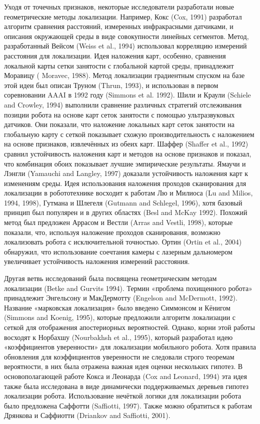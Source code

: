 \documentclass[10pt,a4paper]{article}
\begin{document}
Уходя от точечных признаков, некоторые исследователи разработали новые геометрические методы локализации. Например, Кокс (Cox, 1991) разработал алгоритм  сравнения расстояний, измеренных инфракрасными датчиками, и описания окружающей среды в виде совокупности линейных сегментов. Метод, разработанный Вейсом (Weiss et al., 1994) использовал корреляцию измерений расстояния для локализации. Идея наложения карт, особенно, сравнения локальной карты сетки занятости с глобальной картой среды, принадлежит Моравицу ( Moravec, 1988). Метод локализации градиентным спуском на базе этой идеи был описан Труном (Thrun, 1993), и использован в первом соревновании AAAI в 1992 году (Simmons et al. 1992). Шили и Краули (Schiele and Crowley, 1994) выполнили сравнение различных стратегий отслеживания позиции робота на основе карт сеток занятости с помощью ультразвуковых датчиков. Они показали, что наложение локальных карт сеток занятости на глобальную карту с сеткой показывает схожую производительность с наложением на основе признаков, извлечённых из обеих карт. Шаффер (Shaffer et al., 1992) сравнил устойчивость наложения карт и методов на основе признаков и показал, что комбинация обоих показывает лучшие эмпирические результаты. Ямаучи и Лэнгли (Yamauchi and Langley, 1997) доказали устойчивость наложения карт к изменениям среды. Идея использования наложения проходов сканирования для локализации в робототехнике восходит к работам Лю и Милиоса (Lu and Milios, 1994, 1998), Гутмана и Шлегеля (Gutmann and Schlegel, 1996), хотя базовый принцип был популярен и в других областях (Besl and McKay 1992). Похожий метод был предложен Аррасом и Вестли (Arras and Vestli, 1998), которые показали, что, используя наложение проходов сканирования, возможно локализовать робота с исключительной точностью. Ортин (Ortin et al., 2004) обнаружил, что использование соечтания камеры с лазерным дальномером увеличивает устойчивость наложения измерений расстояния.

Другая ветвь исследований была посвящена геометрическим методам локализации (Betke and Gurvits 1994). Термин «проблема похищенного робота» принадлежит Энгельсону и МакДермотту (Engelson and McDermott, 1992). Название «марковская локализация» было введено Симмонсом и Кёнигом (Simmons and Koenig, 1995), которые предложили алгоритм локализации с сеткой для отображения апостериорных вероятностей. Однако, корни этой работы восходят к Норбахшу (Nourbakhsh et al., 1995), который разработал идею «коэффициентов уверенности» для локализации мобильного робота. Хотя правила обновления для коэффициентов уверенности не следовали строго теоремам вероятности, в них была отражена важная идея оценки нескольких гипотез. В основополагающей работе Кокса и Леонарда (Cox and Leonard, 1994) эта идея также была исследована в виде динамически поддерживаемых деревьев гипотез локализации робота. Использование нечёткой логики для локализации робота было предложена Саффотти (Saffiotti, 1997).  Также можно обратиться к работам Дрянкова и Саффиотти (Driankov and Saffiotti, 2001).\\
\end{document}
